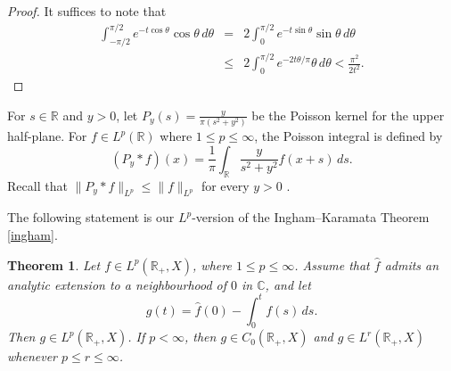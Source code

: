 \documentclass[11pt]{amsart}
\newtheorem{theorem}{Theorem}[section]
\theoremstyle{definition}
\theoremstyle{remark}
\numberwithin{equation}{section}
\begin{document}
\begin{proof}
It suffices to note that
\begin{eqnarray*}
\int_{-\pi/2}^{\pi/2}e^{-t\cos\theta}\cos\theta\, d\theta&=&2\int_{0}^{\pi/2}e^{-t\sin\theta}\sin\theta\, d\theta \\
&\le& 2\int_{0}^{\pi/2}e^{-{2t\theta}/{\pi}} \theta\, d\theta < \frac{\pi^2}{2t^2} .
\end{eqnarray*}
\end{proof}

For $s \in {{\mathbb R}}$ and $y>0$, let  $P_y(s)=\frac{y}{\pi(s^2+y^2)}$ be the Poisson kernel for the upper half-plane.  For $f \in L^p(\mathbb R)$ where $1 \le p \le \infty$, the Poisson integral is defined by
\begin{equation*}
(P_y*f)(x)=\frac{1}{\pi} \int_{\mathbb R}\frac{y}{s^2+y^2}f(x+s)\, ds.
\end{equation*}
Recall that $\|P_y*f\|_{L^p}\le \|f\|_{L^p}$ for every $y>0$ \cite[Section VI.B]{Koo2}.

The following statement is our $L^p$-version of the Ingham--Karamata Theorem \ref{ingham}.

\begin{theorem}\label{lpingham}
Let $f \in L^p(\mathbb R_+, X)$, where $1 \le p \le \infty$.  Assume that $\widehat f$ admits an analytic extension to a neighbourhood of $0$ in ${{\mathbb C}}$, and let
$$
g(t)=\widehat f(0) -\int_{0}^{t} f(s) \, ds.
$$
Then $g \in L^p (\mathbb R_+, X)$.  If $p<\infty$, then  $g \in C_0(\mathbb R_+, X)$ and $g
\in L^r(\mathbb R_+,X)$ whenever $p \le r \le \infty$.
\end{theorem}
\end{document}
